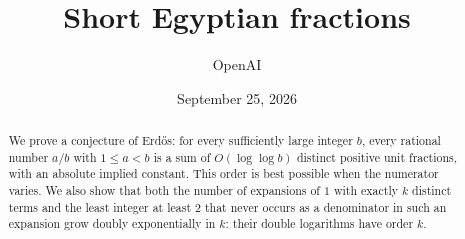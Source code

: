 \documentclass[11pt]{article}
\title{Short Egyptian fractions}
\author{OpenAI}
\date{September 25, 2026}
\theoremstyle{definition}
\theoremstyle{remark}
\numberwithin{equation}{section}
\begin{document}
\maketitle
\begin{abstract}
We prove a conjecture of Erd\H{o}s: for every sufficiently large integer
$b$, every rational number $a/b$ with $1\le a<b$ is a sum of
$O(\log\log b)$ distinct positive unit fractions, with an absolute implied
constant. This order is best possible when the numerator varies. We also
show that both the number of expansions of $1$ with exactly $k$ distinct
terms and the least integer at least $2$ that never occurs as a denominator
in such an expansion grow doubly exponentially in $k$: their double
logarithms have order $k$.
\end{abstract}
\tableofcontents







\begingroup
\small


\endgroup
\end{document}
